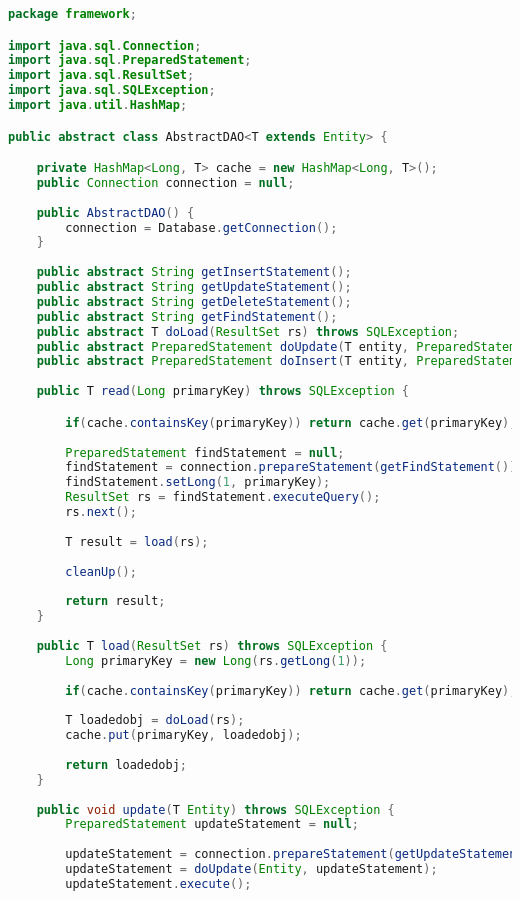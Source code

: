 \begin{lstlisting}[language=java, style=java, caption={AbstractDAO.java},
label={lst:lst3}]
package framework;

import java.sql.Connection;
import java.sql.PreparedStatement;
import java.sql.ResultSet;
import java.sql.SQLException;
import java.util.HashMap;

public abstract class AbstractDAO<T extends Entity> {

    private HashMap<Long, T> cache = new HashMap<Long, T>();
    public Connection connection = null;
	
    public AbstractDAO() {
		connection = Database.getConnection();
	}
	
	public abstract String getInsertStatement();
	public abstract String getUpdateStatement();
	public abstract String getDeleteStatement();
	public abstract String getFindStatement();
	public abstract T doLoad(ResultSet rs) throws SQLException;
	public abstract PreparedStatement doUpdate(T entity, PreparedStatement stmnt) throws SQLException;
	public abstract PreparedStatement doInsert(T entity, PreparedStatement stmnt) throws SQLException;
	
	public T read(Long primaryKey) throws SQLException {

        if(cache.containsKey(primaryKey)) return cache.get(primaryKey);
		        
		PreparedStatement findStatement = null;
        findStatement = connection.prepareStatement(getFindStatement());
        findStatement.setLong(1, primaryKey);
        ResultSet rs = findStatement.executeQuery();
        rs.next();
        
        T result = load(rs);
    
		cleanUp();
		
	    return result;
	}
	
	public T load(ResultSet rs) throws SQLException {
        Long primaryKey = new Long(rs.getLong(1));
        
        if(cache.containsKey(primaryKey)) return cache.get(primaryKey);
        
        T loadedobj = doLoad(rs);
        cache.put(primaryKey, loadedobj);
        
        return loadedobj;
	}
	
	public void update(T Entity) throws SQLException {
		PreparedStatement updateStatement = null;
		
        updateStatement = connection.prepareStatement(getUpdateStatement());
        updateStatement = doUpdate(Entity, updateStatement);
        updateStatement.execute();
        

\end{lstlisting}
